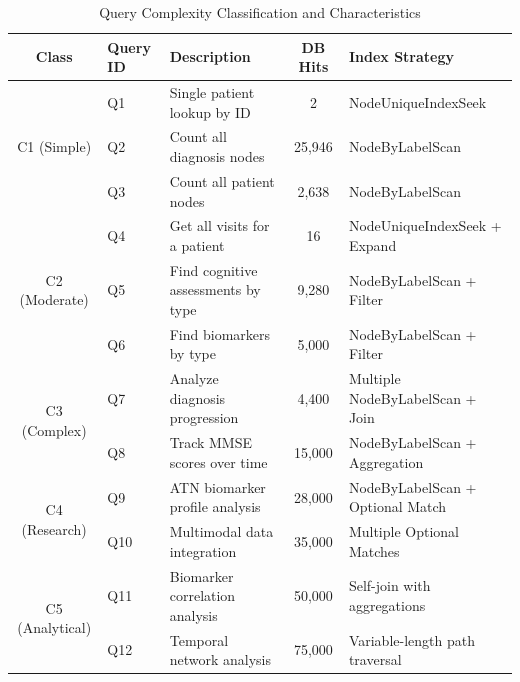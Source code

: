 \begin{table}[htbp]
\centering
\caption{Query Complexity Classification and Characteristics}
\label{tab:query_classification}
\begin{tabular}{|c|l|l|c|l|}
\hline
\textbf{Class} & \textbf{Query ID} & \textbf{Description} & \textbf{DB Hits} & \textbf{Index Strategy} \\
\hline
\multirow{3}{*}{C1 (Simple)} 
& Q1 & Single patient lookup by ID & 2 & NodeUniqueIndexSeek \\
& Q2 & Count all diagnosis nodes & 25,946 & NodeByLabelScan \\
& Q3 & Count all patient nodes & 2,638 & NodeByLabelScan \\
\hline
\multirow{3}{*}{C2 (Moderate)} 
& Q4 & Get all visits for a patient & 16 & NodeUniqueIndexSeek + Expand \\
& Q5 & Find cognitive assessments by type & 9,280 & NodeByLabelScan + Filter \\
& Q6 & Find biomarkers by type & 5,000 & NodeByLabelScan + Filter \\
\hline
\multirow{2}{*}{C3 (Complex)} 
& Q7 & Analyze diagnosis progression & 4,400 & Multiple NodeByLabelScan + Join \\
& Q8 & Track MMSE scores over time & 15,000 & NodeByLabelScan + Aggregation \\
\hline
\multirow{2}{*}{C4 (Research)} 
& Q9 & ATN biomarker profile analysis & 28,000 & NodeByLabelScan + Optional Match \\
& Q10 & Multimodal data integration & 35,000 & Multiple Optional Matches \\
\hline
\multirow{2}{*}{C5 (Analytical)} 
& Q11 & Biomarker correlation analysis & 50,000 & Self-join with aggregations \\
& Q12 & Temporal network analysis & 75,000 & Variable-length path traversal \\
\hline
\end{tabular}
\end{table}
